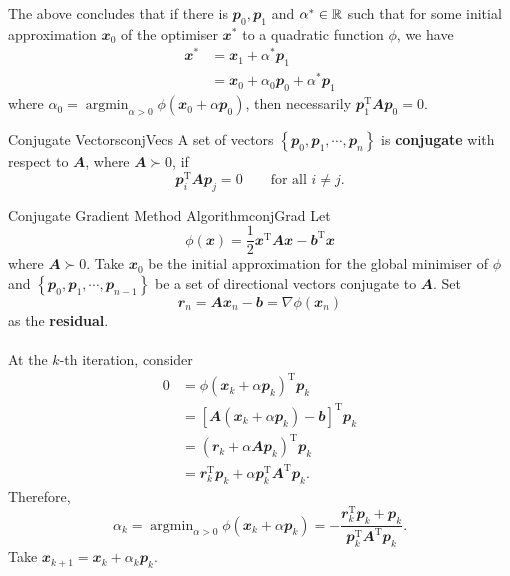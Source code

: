 \documentclass[math, code]{amznotes}
\theoremstyle{remark}
\DeclareMathOperator*{\argmin}{argmin}
\begin{document}
The above concludes that if there is $\mathbfit{p}_0, \mathbfit{p}_1$ and $\alpha^* \in \mathbb{R}$ such that for some initial approximation $\mathbfit{x}_0$ of the optimiser $\mathbfit{x}^*$ to a quadratic function $\phi$, we have
\begin{align*}
    \mathbfit{x}^* & = \mathbfit{x}_1 + \alpha^*\mathbfit{p}_1 \\
    & = \mathbfit{x}_0 + \alpha_0\mathbfit{p}_0 + \alpha^*\mathbfit{p}_1
\end{align*}
where $\alpha_0 = \argmin_{\alpha > 0} \phi(\mathbfit{x}_0 + \alpha\mathbfit{p}_0)$, then necessarily $\mathbfit{p}_1^{\mathrm{T}}\mathbfit{Ap}_0 = 0$.
\begin{dfnbox}{Conjugate Vectors}{conjVecs}
    A set of vectors $\left\{\mathbfit{p}_0, \mathbfit{p}_1, \cdots, \mathbfit{p}_n\right\}$ is {\color{red} \textbf{conjugate}} with respect to $\mathbfit{A}$, where $\mathbfit{A} \succ 0$, if
    \begin{equation*}
        \mathbfit{p}_i^{\mathrm{T}}\mathbfit{Ap}_j = 0 \qquad \textrm{for all } i \neq j.
    \end{equation*}
\end{dfnbox}
\begin{tecbox}{Conjugate Gradient Method Algorithm}{conjGrad}
    Let 
    \begin{equation*}
        \phi(\mathbfit{x}) = \frac{1}{2}\mathbfit{x}^{\mathrm{T}}\mathbfit{Ax} - \mathbfit{b}^{\mathrm{T}}\mathbfit{x}
    \end{equation*}
    where $\mathbfit{A} \succ 0$. Take $\mathbfit{x}_0$ be the initial approximation for the global minimiser of $\phi$ and $\left\{\mathbfit{p}_0, \mathbfit{p}_1, \cdots, \mathbfit{p}_{n - 1}\right\}$ be a set of directional vectors conjugate to $\mathbfit{A}$. Set
    \begin{equation*}
        \mathbfit{r}_n = \mathbfit{Ax}_n - \mathbfit{b} = \nabla \phi(\mathbfit{x}_n)
    \end{equation*}
    as the {\color{red} \textbf{residual}}.
    \\\\
    At the $k$-th iteration, consider
    \begin{align*}
        0 & = \phi(\mathbfit{x}_k + \alpha\mathbfit{p}_k)^{\mathrm{T}}\mathbfit{p}_k \\
        & = \left[\mathbfit{A}(\mathbfit{x}_k + \alpha\mathbfit{p}_k) - \mathbfit{b}\right]^{\mathrm{T}}\mathbfit{p}_k \\
        & = \left(\mathbfit{r}_k + \alpha\mathbfit{Ap}_k\right)^{\mathrm{T}}\mathbfit{p}_k \\
        & = \mathbfit{r}_k^{\mathrm{T}}\mathbfit{p}_k + \alpha\mathbfit{p}_k^{\mathrm{T}}\mathbfit{A}^{\mathrm{T}}\mathbfit{p}_k.
    \end{align*}
    Therefore,
    \begin{equation*}
        \alpha_k = \argmin_{\alpha > 0}\phi(\mathbfit{x}_k + \alpha\mathbfit{p}_k) = -\frac{\mathbfit{r}_k^{\mathrm{T}}\mathbfit{p}_k + \mathbfit{p}_k}{\mathbfit{p}_k^{\mathrm{T}}\mathbfit{A}^{\mathrm{T}}\mathbfit{p}_k}.
    \end{equation*}
    Take $\mathbfit{x}_{k + 1} = \mathbfit{x}_k + \alpha_k\mathbfit{p}_k$.
\end{tecbox}
\end{document}
